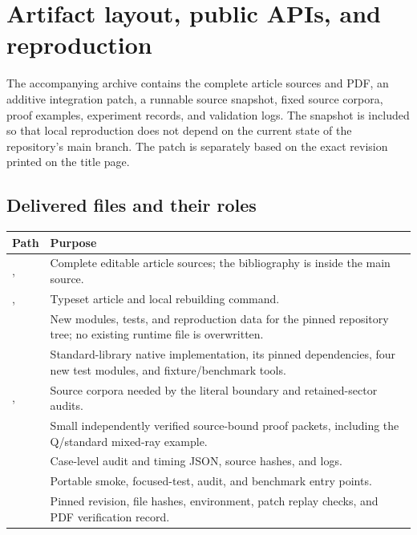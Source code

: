 \section{Artifact layout, public APIs, and reproduction}
\label{main:reproduction}

The accompanying archive contains the complete article sources and PDF,
an additive integration patch, a runnable source snapshot, fixed source
corpora, proof examples, experiment records, and validation logs.  The snapshot
is included so that local reproduction does not depend on the current state
of the repository's main branch.  The patch is separately based on the exact
revision printed on the title page.

\subsection{Delivered files and their roles}

\begin{center}\small
\begin{tabularx}{\textwidth}{@{}p{}Y@{}}
\toprule
Path & Purpose\\
\midrule
{},  & Complete editable article sources;
the bibliography is inside the main source.\\
,  & Typeset article and local rebuilding command.\\
 & New modules, tests, and reproduction data for the
pinned repository tree; no existing runtime file is overwritten.\\
 & Standard-library native implementation, its pinned
dependencies, four new test modules, and fixture/benchmark tools.\\
,  & Source corpora needed
by the literal boundary and retained-sector audits.\\
 & Small independently verified source-bound proof packets,
including the Q/standard mixed-ray example.\\
 & Case-level audit and timing JSON, source hashes, and logs.\\
 & Portable smoke, focused-test, audit, and benchmark
entry points.\\
 & Pinned revision, file hashes, environment, patch replay
checks, and PDF verification record.\\
\bottomrule
\end{tabularx}
\end{center}

